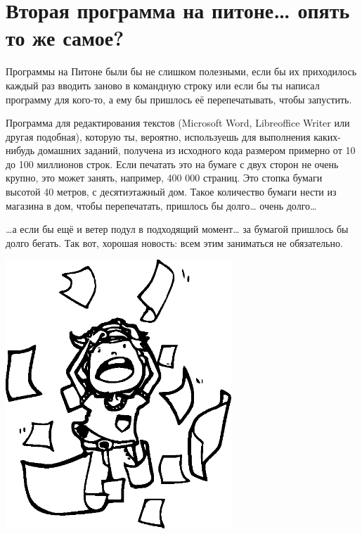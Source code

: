 \section{Вторая программа на питоне… опять то же самое?}

Программы на Питоне были бы не слишком полезными, если бы их приходилось каждый раз вводить заново в командную строку или если бы ты написал программу для кого-то, а ему бы пришлось её перепечатывать, чтобы запустить.

Программа для редактирования текстов (Microsoft Word, Libreoffice Writer или другая подобная), которую ты, вероятно, используешь для выполнения каких-нибудь домашних заданий, получена из исходного кода размером примерно от 10 до 100 миллионов строк. Если печатать это на бумаге с двух сторон не очень крупно, это может занять, например, 400 000 страниц. Это стопка бумаги высотой 40 метров, с десятиэтажный дом. Такое количество бумаги нести из магазина в дом, чтобы перепечатать, пришлось бы долго… очень долго…

…а если бы ещё и ветер подул в подходящий момент… за бумагой пришлось бы долго бегать. Так вот, хорошая новость: всем этим заниматься не обязательно.

\begin{center}
\includegraphics*[width=85mm]{../en/pullinghair.eps}
\end{center}

